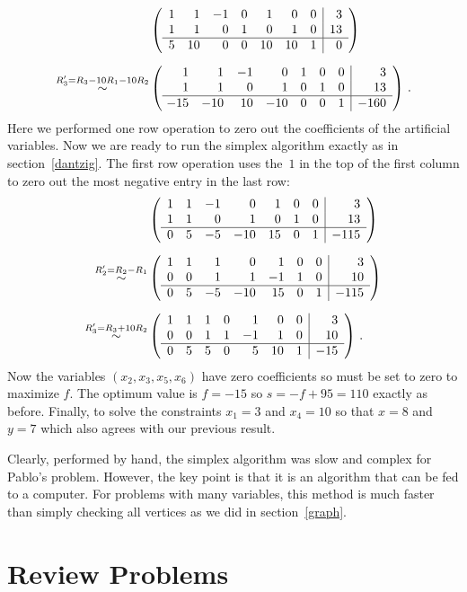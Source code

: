 \begin{example}
\begin{align*}
&
\left(\begin{array}{rrrrrrr|r}
1&1&-1&0&1&0&0&3\\
1&1&0&1&0&1&0&13\\\hline
5&10&\ 0&0&10&10&1&0
\end{array}\right)\\[2mm]
\stackrel{\small R_3'=R_3-10 R_1-10R_2 }\sim&
\left(\begin{array}{rrrrrrr|r}
1&1&-1&0&1&0&0&3\\
1&1&0&1&0&1&0&13\\\hline
\!-15&-10&\ 10&-10&0&0&1&-160
\end{array}\right)
\, .
\end{align*}
Here we performed one row operation to zero out the coefficients of the artificial variables.
Now we are ready to run the simplex algorithm exactly as in section~\ref{dantzig}. The first row operation 
uses the~$1$ in the top of the first column to zero out the most negative entry in the last row:
\begin{align*}&
\left(\begin{array}{rrrrrrr|r}
1&1&-1&0&1&0&0&3\\
1&1&0&1&0&1&0&13\\\hline
0&5&-5&-10&15&0&1&-115
\end{array}\right)\\[2mm]
\stackrel{\small R_2'=R_2-R_1}\sim&
\left(\begin{array}{rrrrrrr|r}
1&1&1&0&1&0&0&3\\
0&0&1&1&-1&1&0&10\\\hline
0&5&-5&-10&15&0&1&-115
\end{array}\right)\\[2mm]
\stackrel{\small R_3'=R_3+10R_2}\sim&
\left(\begin{array}{rrrrrrr|r}
1&1&1&0&1&0&0&3\\
0&0&1&1&-1&1&0&10\\\hline
0&5&5&0&5&10&1&-15
\end{array}\right)
\, .
\end{align*}
Now the variables $(x_2,x_3,x_5,x_6)$ have zero coefficients so must be set to zero to maximize $f$.
The optimum value is $f=-15$ so $s=-f+95=110$ exactly as before. Finally, to solve the constraints $x_1=3$
and $x_4=10$ so that $x=8$ and $y=7$ which also agrees with our previous result.
 \end{example}


Clearly, performed by hand,  the simplex algorithm was slow and complex for Pablo's problem. However, the key point is
that it is an algorithm that can be fed to a computer. For problems with many variables, this method is much faster than 
simply checking all vertices as we did in section~\ref{graph}.

\section{Review Problems}





